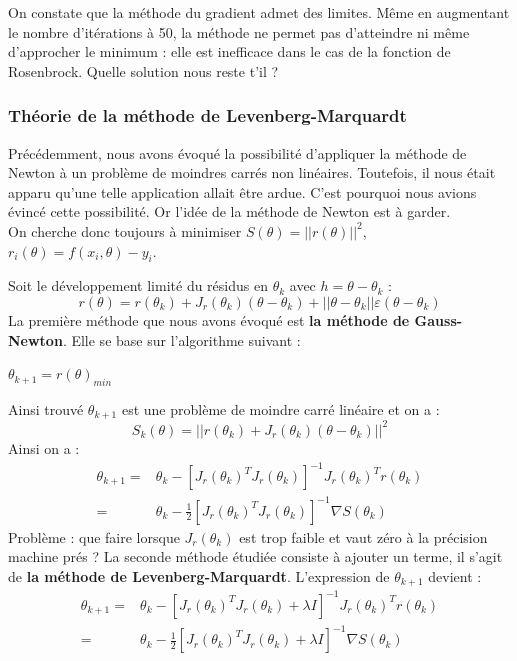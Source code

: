 \documentclass[a4paper,10pt]{report}
\begin{document}
On constate que la méthode du gradient admet des limites. Même en augmentant le nombre d'itérations à 50, la méthode ne permet pas d'atteindre ni même d'approcher le minimum : elle est inefficace dans le cas de la fonction de Rosenbrock. Quelle solution nous reste t'il ?\\

\subsubsection{Théorie de la méthode de Levenberg-Marquardt}
Précédemment, nous avons évoqué la possibilité d'appliquer la méthode de Newton à un problème de moindres carrés non linéaires. Toutefois, il nous était apparu qu'une telle application allait être ardue. C'est pourquoi nous avions évincé cette possibilité. Or l'idée de la méthode de Newton est à garder.\\
On cherche donc toujours à minimiser $S(\theta)=||r(\theta)||^2$, $r_i(\theta)=f(x_i,\theta)-y_i$.

Soit le développement limité du résidus en $\theta_k$ avec $h=\theta - \theta_k$ :
\abovedisplayskip=0mm
\begin{displaymath}
r(\theta)=r(\theta_k)+J_r(\theta_k)(\theta-\theta_k) + ||\theta-\theta_k||\varepsilon (\theta - \theta_k)
\end{displaymath}
La première méthode que nous avons évoqué est \textbf{la méthode de Gauss-Newton}. Elle se base sur l'algorithme suivant :
\begin{algorithm}
\begin{algorithmic}
\STATE $\theta_{k+1} = r(\theta)_{min}$
\ENDFOR
\end{algorithmic}
\end{algorithm}
Ainsi trouvé $\theta_{k+1}$ est une problème de moindre carré linéaire et on a :
\abovedisplayskip=0mm
\begin{displaymath}
S_k(\theta)=||r(\theta_k)+J_r(\theta_k)(\theta-\theta_k)||^2
\end{displaymath}
Ainsi on a :
\abovedisplayskip=0mm
\begin{align*}
\theta_{k+1} = & \theta_k - [J_r(\theta_k)^TJ_r(\theta_k)]^{-1} J_r(\theta_k)^Tr(\theta_k) \\
			 = & \theta_k - \frac{1}{2}[J_r(\theta_k)^TJ_r(\theta_k)]^{-1} \nabla S(\theta_k)
\end{align*}
Problème : que faire lorsque $J_r(\theta_k)$ est trop faible et vaut zéro à la précision machine prés ? La seconde méthode étudiée consiste à ajouter un terme, il s'agit de \textbf{la méthode de Levenberg-Marquardt}. L'expression de $\theta_{k+1}$ devient :
\begin{align*}
\theta_{k+1} = & \theta_k - [J_r(\theta_k)^TJ_r(\theta_k) + \lambda I]^{-1} J_r(\theta_k)^Tr(\theta_k) \\
			 = & \theta_k - \frac{1}{2}[J_r(\theta_k)^TJ_r(\theta_k) + \lambda I]^{-1} \nabla S(\theta_k)
\end{align*}
\end{document}
